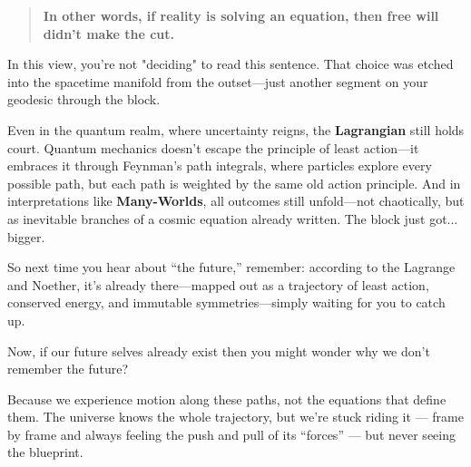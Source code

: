 \begin{tcolorbox}[colback=gray!5!white, colframe=gray!50!black, breakable, title={Historical Sidebar: The Block Universe—When Physics Froze Time}]
    \medskip
    
    \begin{quote}
    \textbf{In other words, if reality is solving an equation, then free will didn’t make the cut.}
    \end{quote}

    \medskip
    
    In this view, you’re not "deciding" to read this sentence. That choice was etched into the spacetime manifold from the outset—just another segment on your geodesic through the block.
    
    \medskip
    
    Even in the quantum realm, where uncertainty reigns, the \textbf{Lagrangian} still holds court. Quantum mechanics doesn’t escape the principle of least action—it embraces it through Feynman’s path integrals, where particles explore every possible path, but each path is weighted by the same old action principle. And in interpretations like \textbf{Many-Worlds}, all outcomes still unfold—not chaotically, but as inevitable branches of a cosmic equation already written. The block just got... bigger.
    
    \medskip
    
    So next time you hear about ``the future,'' remember: according to the Lagrange and Noether, it’s already there—mapped out as a trajectory of least action, conserved energy, and immutable symmetries—simply waiting for you to catch up.

    \medskip

    Now, if our future selves already exist then you might wonder why we don’t remember the future?

    \medskip

    Because we experience motion along these paths, not the equations that define them. The universe knows the whole trajectory, but we’re stuck riding it --- frame by frame and always feeling the push and pull of its ``forces'' --- but never seeing the blueprint.
    
\end{tcolorbox}

